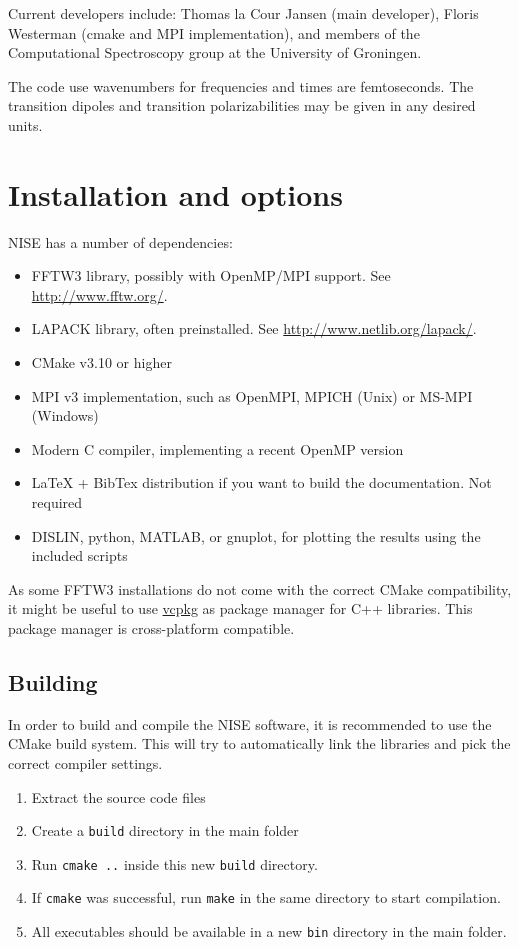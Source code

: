 \documentclass[12pt]{book}
\begin{document}
Current developers include: Thomas la Cour Jansen (main developer), Floris Westerman (cmake and MPI implementation), and members of the Computational Spectroscopy group at the University of Groningen.

The code use wavenumbers for frequencies and times are femtoseconds. The transition
dipoles and transition polarizabilities may be given in any desired units.

\chapter{Installation and options}
NISE has a number of dependencies:
\begin{itemize}
\item FFTW3 library, possibly with OpenMP/MPI support. See \url{http://www.fftw.org/}.
\item LAPACK library, often preinstalled. See \url{http://www.netlib.org/lapack/}.
\item CMake v3.10 or higher
\item MPI v3 implementation, such as OpenMPI, MPICH (Unix) or MS-MPI (Windows)
\item Modern C compiler, implementing a recent OpenMP version
\item LaTeX + BibTex distribution if you want to build the documentation. Not required
\item DISLIN, python, MATLAB, or gnuplot, for plotting the results using the included scripts
\end{itemize}
As some FFTW3 installations do not come with the correct CMake compatibility, it might be useful to use \href{https://github.com/microsoft/vcpkg}{vcpkg} as package manager for C++ libraries. This package manager is cross-platform compatible.

\section{Building}
In order to build and compile the NISE software, it is recommended to use the CMake build system. This will try to automatically link the libraries and pick the correct compiler settings.
\begin{enumerate}
\item Extract the source code files
\item Create a \texttt{build} directory in the main folder
\item Run \texttt{cmake ..} inside this new {\tt build} directory.
\item If {\tt cmake} was successful, run {\tt make} in the same directory to start compilation.
\item All executables should be available in a new {\tt bin} directory in the main folder.
\end{enumerate}
\end{document}
